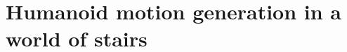 \chapter{Humanoid motion generation in a world of stairs}

\makeatletter
{}
\makeatother



\makeatletter
\newcommand{\removelatexerror}{\let\@latex@error\@gobble}
\makeatother
\let\oldnl\nl%
\newcommand{\nonl}{\renewcommand{\nl}{\let\nl\oldnl}}%

\renewcommand\textfraction{0.0}
\renewcommand\bottomfraction{1.0}
\renewcommand\topfraction{1.0}
\renewcommand\dbltopfraction{1.0}
\setcounter{topnumber}{8}
\setcounter{dbltopnumber}{8}
\setcounter{bottomnumber}{8}
\setcounter{totalnumber}{8}

\def\RealSet{{I\!\!R}}
\def\bull{\vrule height .9ex width .8ex depth -.1ex} %
\newtheorem{proposition}{Proposition}
\newtheorem{remark}{Remark}
\newtheorem{assumption}{Assumption}

\newenvironment{braced}
 {\par\smallskip\hbox to\columnwidth\bgroup
  \hss$\left\{\begin{minipage}{\columnwidth}}
 {\end{minipage}\right.$\hss\egroup\smallskip}

	
	

